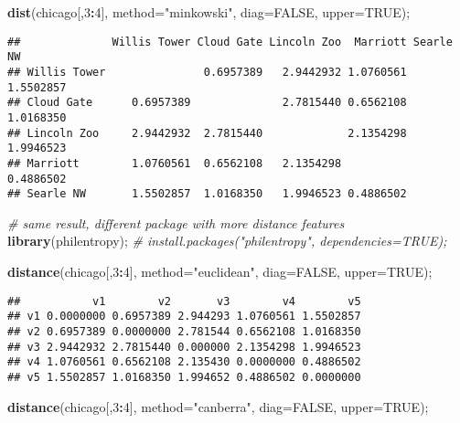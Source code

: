 \documentclass[
]{article}
\newenvironment{Shaded}{\begin{snugshade}}{\end{snugshade}}
\newcommand{\CommentTok}[1]{\textcolor[rgb]{0.56,0.35,0.01}{\textit{#1}}}
\newcommand{\DataTypeTok}[1]{\textcolor[rgb]{0.13,0.29,0.53}{#1}}
\newcommand{\DecValTok}[1]{\textcolor[rgb]{0.00,0.00,0.81}{#1}}
\newcommand{\KeywordTok}[1]{\textcolor[rgb]{0.13,0.29,0.53}{\textbf{#1}}}
\newcommand{\NormalTok}[1]{#1}
\newcommand{\OperatorTok}[1]{\textcolor[rgb]{0.81,0.36,0.00}{\textbf{#1}}}
\newcommand{\OtherTok}[1]{\textcolor[rgb]{0.56,0.35,0.01}{#1}}
\newcommand{\StringTok}[1]{\textcolor[rgb]{0.31,0.60,0.02}{#1}}
\begin{document}
\begin{Shaded}
\begin{Highlighting}[]
\KeywordTok{dist}\NormalTok{(chicago[,}\DecValTok{3}\OperatorTok{:}\DecValTok{4}\NormalTok{], }\DataTypeTok{method=}\StringTok{"minkowski"}\NormalTok{, }\DataTypeTok{diag=}\OtherTok{FALSE}\NormalTok{, }\DataTypeTok{upper=}\OtherTok{TRUE}\NormalTok{);}
\end{Highlighting}
\end{Shaded}

\begin{verbatim}
##              Willis Tower Cloud Gate Lincoln Zoo  Marriott Searle NW
## Willis Tower               0.6957389   2.9442932 1.0760561 1.5502857
## Cloud Gate      0.6957389              2.7815440 0.6562108 1.0168350
## Lincoln Zoo     2.9442932  2.7815440             2.1354298 1.9946523
## Marriott        1.0760561  0.6562108   2.1354298           0.4886502
## Searle NW       1.5502857  1.0168350   1.9946523 0.4886502
\end{verbatim}

\begin{Shaded}
\begin{Highlighting}[]
\CommentTok{\# same result, different package with more distance features}
\KeywordTok{library}\NormalTok{(philentropy); }\CommentTok{\# install.packages("philentropy", dependencies=TRUE);}

\KeywordTok{distance}\NormalTok{(chicago[,}\DecValTok{3}\OperatorTok{:}\DecValTok{4}\NormalTok{], }\DataTypeTok{method=}\StringTok{"euclidean"}\NormalTok{, }\DataTypeTok{diag=}\OtherTok{FALSE}\NormalTok{, }\DataTypeTok{upper=}\OtherTok{TRUE}\NormalTok{);}
\end{Highlighting}
\end{Shaded}

\begin{verbatim}
##           v1        v2       v3        v4        v5
## v1 0.0000000 0.6957389 2.944293 1.0760561 1.5502857
## v2 0.6957389 0.0000000 2.781544 0.6562108 1.0168350
## v3 2.9442932 2.7815440 0.000000 2.1354298 1.9946523
## v4 1.0760561 0.6562108 2.135430 0.0000000 0.4886502
## v5 1.5502857 1.0168350 1.994652 0.4886502 0.0000000
\end{verbatim}

\begin{Shaded}
\begin{Highlighting}[]
\KeywordTok{distance}\NormalTok{(chicago[,}\DecValTok{3}\OperatorTok{:}\DecValTok{4}\NormalTok{], }\DataTypeTok{method=}\StringTok{"canberra"}\NormalTok{, }\DataTypeTok{diag=}\OtherTok{FALSE}\NormalTok{, }\DataTypeTok{upper=}\OtherTok{TRUE}\NormalTok{);}
\end{Highlighting}
\end{Shaded}
\end{document}

